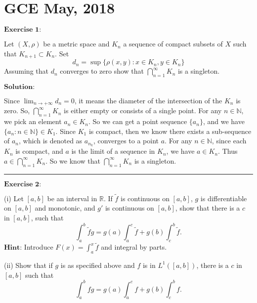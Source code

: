 \documentclass[12pt]{article}
\begin{document}
\newpage

\section{GCE May, 2018}

$\textbf{Exercise 1:}$

Let $(X, \rho)$ be a metric space and $K_{n}$ a sequence of compact subsets of $X$ such that $K_{n+1} \subset K_{n}$. Set
\begin{equation*}
   d_{n} = \sup \{ \rho (x, y): x \in K_{n}, y \in K_{n} \}
\end{equation*}
Assuming that $d_{n}$ converges to zero show that $\bigcap_{n = 1}^{\infty} K_{n}$ is a singleton.

\vspace{8pt}

$\textbf{Solution:}$

Since $\lim_{n \to + \infty} d_{n} = 0$, it means the diameter of the intersection of the $K_{n}$ is zero. So, $\bigcap_{n = 1}^{\infty} K_{n}$ is either empty or consists of a single point. For any $n \in \mathbb{N}$, we pick an element $a_{n} \in K_{n}$. So we can get a point sequence $\{a_{n}\}$, and we have $\{a_{n}: n \in \mathbb{N}\} \in K_{1}$. Since $K_{1}$ is compact, then we know there exists a sub-sequence of $a_{n}$, which is denoted as $a_{n_{k}}$, converges to a point $a$. For any $n \in \mathbb{N}$, since each $K_{n}$ is compact, and $a$ is the limit of a sequence in $K_{n}$, we have $a \in K_{n}$. Thus $a \in \bigcap_{n = 1}^{\infty} K_{n}$. So we know that $\bigcap_{n = 1}^{\infty} K_{n}$ is a singleton.

\noindent\rule[0.25\baselineskip]{\textwidth}{0.5pt}

\vspace{8pt}
$\textbf{Exercise 2:}$

(i) Let $[a, b]$ be an interval in $\mathbb{R}$. If $\tilde{f}$ is continuous on $[a, b]$, $g$ is differentiable on $[a, b]$ and monotonic, and $g'$ is continuous on $[a, b]$, show that there is a $c$ in $[a, b]$, such that
\begin{equation*}
   \int_{a}^{b} \tilde{f}g = g(a) \int_{a}^{c} \tilde{f} + g(b) \int_{c}^{b} \tilde{f}.
\end{equation*}
$\textbf{Hint:}$ Introduce $F(x) = \int_{a}^{x} \tilde{f}$ and integral by parts.

(ii) Show that if $g$ is as specified above and $f$ is in $L^{1} ([a, b])$, there is a $c$ in $[a, b]$ such that 
\begin{equation*}
   \int_{a}^{b} f g = g(a) \int_{a}^{c} f + g(b) \int_{c}^{b} f.
\end{equation*}
\end{document}
